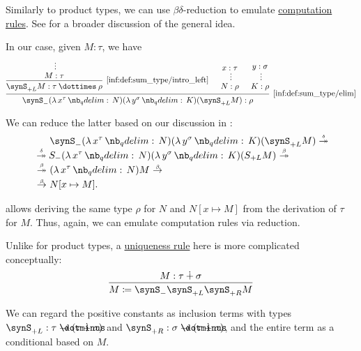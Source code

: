 \begin{remark}\label{rem:sum_type_equality_rules}
  Similarly to product types, we can use \( \beta\delta \)-reduction to emulate \hyperref[rem:type_theory_rule_classification/equality/computation]{computation rules}. See  for a broader discussion of the general idea.

  In our case, given \( M: \tau \), we have
  \begin{equation*}
    \begin{prooftree}
      \hypo{}
      \ellipsis {} { M: \tau }
      \infer1[\ref{inf:def:sum_type/intro_left}]{ \synS_{+L} M: \tau \syntimes \rho }

      \hypo{ x: \tau }
      \ellipsis {} { N: \rho }

      \hypo{ y: \sigma }
      \ellipsis {} { K: \rho }

      \infer3[\ref{inf:def:sum_type/elim}]{ \synS_- (\qabs {x^\tau} N) (\qabs {y^\sigma} K) (\synS_{+L} M): \rho }
    \end{prooftree}
  \end{equation*}

  We can reduce the latter based on our discussion in :
  \begin{align*}
    &\phantom{{}\bred*{}}
    \synS_- (\qabs {x^\tau} N) (\qabs {y^\sigma} K) (\synS_{+L} M)
    \dred* \\ &\dred*
    S_- (\qabs {x^\tau} N) (\qabs {y^\sigma} K) (S_{+L} M)
    \bred* \\ &\bred*
    (\qabs {x^\tau} N) M
    \bred \\ &\bred
    N[x \mapsto M].
  \end{align*}

   allows deriving the same type \( \rho \) for \( N \) and \( N[x \mapsto M] \) from the derivation of \( \tau \) for \( M \). Thus, again, we can emulate computation rules via reduction.

  Unlike for product types, a \hyperref[rem:type_theory_rule_classification/equality/uniqueness]{uniqueness rule} here is more complicated conceptually:
  \begin{equation*}
    \begin{prooftree}
      \hypo{ M: \tau \synplus \sigma }
      \infer1{ M \coloneqq \synS_- \synS_{+L} \synS_{+R} M }
    \end{prooftree}
  \end{equation*}

  We can regard the positive constants as inclusion terms with types \( \synS_{+L}: \tau \synimplies (\tau \synplus \sigma) \) and \( \synS_{+R}: \sigma \synimplies (\tau \synplus \sigma) \), and the entire term as a conditional based on \( M \).
\end{remark}

